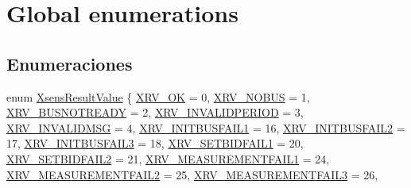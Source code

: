 \hypertarget{group__enums}{\section{\-Global enumerations}
\label{group__enums}
}
\subsection*{\-Enumeraciones}
\begin{DoxyCompactItemize}
\item 
enum \hyperlink{group__enums_ga822a2260a20af524029eef9e9a51ff6f}{\-Xsens\-Result\-Value} \{ \*
\hyperlink{group__enums_gga822a2260a20af524029eef9e9a51ff6fa9ecc38cf5706b4dc62700e99abc3bc73}{\-X\-R\-V\-\_\-\-O\-K} =  0, 
\hyperlink{group__enums_gga822a2260a20af524029eef9e9a51ff6fa9a275575b34ddda2b89a8070ac612fad}{\-X\-R\-V\-\_\-\-N\-O\-B\-U\-S} =  1, 
\hyperlink{group__enums_gga822a2260a20af524029eef9e9a51ff6fa416f4189bde2b9dd21446305ae7757a1}{\-X\-R\-V\-\_\-\-B\-U\-S\-N\-O\-T\-R\-E\-A\-D\-Y} =  2, 
\hyperlink{group__enums_gga822a2260a20af524029eef9e9a51ff6fa68b8e1f0d5ab35d1e99d7de34145663d}{\-X\-R\-V\-\_\-\-I\-N\-V\-A\-L\-I\-D\-P\-E\-R\-I\-O\-D} =  3, 
\*
\hyperlink{group__enums_gga822a2260a20af524029eef9e9a51ff6fa31a1aecb87a28eba8a713878fe62c4c1}{\-X\-R\-V\-\_\-\-I\-N\-V\-A\-L\-I\-D\-M\-S\-G} =  4, 
\hyperlink{group__enums_gga822a2260a20af524029eef9e9a51ff6fab389b4f2206de587e339a8f6ecde0837}{\-X\-R\-V\-\_\-\-I\-N\-I\-T\-B\-U\-S\-F\-A\-I\-L1} =  16, 
\hyperlink{group__enums_gga822a2260a20af524029eef9e9a51ff6faefee03f60e63b0cc3a2a82a42d8748fe}{\-X\-R\-V\-\_\-\-I\-N\-I\-T\-B\-U\-S\-F\-A\-I\-L2} =  17, 
\hyperlink{group__enums_gga822a2260a20af524029eef9e9a51ff6fa803ba36e0350314199c9fc835a3171b4}{\-X\-R\-V\-\_\-\-I\-N\-I\-T\-B\-U\-S\-F\-A\-I\-L3} =  18, 
\*
\hyperlink{group__enums_gga822a2260a20af524029eef9e9a51ff6fa443976b5acba95a8afae99256a5c319c}{\-X\-R\-V\-\_\-\-S\-E\-T\-B\-I\-D\-F\-A\-I\-L1} =  20, 
\hyperlink{group__enums_gga822a2260a20af524029eef9e9a51ff6fa727122b9edaf8059888e67fef35fd067}{\-X\-R\-V\-\_\-\-S\-E\-T\-B\-I\-D\-F\-A\-I\-L2} =  21, 
\hyperlink{group__enums_gga822a2260a20af524029eef9e9a51ff6fa9351c51a7d6b6abf6b85be46035ba00d}{\-X\-R\-V\-\_\-\-M\-E\-A\-S\-U\-R\-E\-M\-E\-N\-T\-F\-A\-I\-L1} =  24, 
\hyperlink{group__enums_gga822a2260a20af524029eef9e9a51ff6fa95e9eb24ae483c3a4b8b9e052e9eba6a}{\-X\-R\-V\-\_\-\-M\-E\-A\-S\-U\-R\-E\-M\-E\-N\-T\-F\-A\-I\-L2} =  25, 
\*
\hyperlink{group__enums_gga822a2260a20af524029eef9e9a51ff6fa99ce60822cc1f3c77c03da0b8d1f72a1}{\-X\-R\-V\-\_\-\-M\-E\-A\-S\-U\-R\-E\-M\-E\-N\-T\-F\-A\-I\-L3} =  26, 

\end{DoxyCompactItemize}
